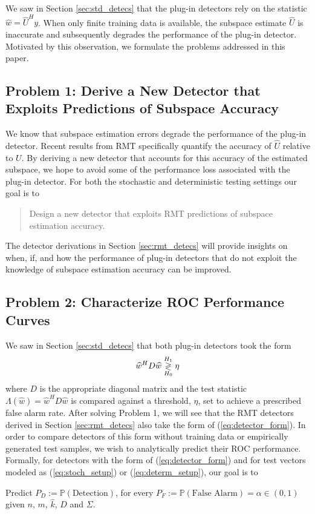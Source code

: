 We saw in Section \ref{sec:std_detecs} that the plug-in detectors rely on the statistic $\widehat{w}=\widehat{U}^Hy$. When only finite training data is available, the subspace estimate $\widehat{U}$ is inaccurate and subsequently degrades the performance of the plug-in detector. Motivated by this observation, we formulate the problems addressed in this paper.

\subsection{Problem 1: Derive a New Detector that Exploits Predictions of Subspace Accuracy}\label{sec:ps_prob2}

We know that subspace estimation errors degrade the performance of the plug-in detector. Recent results from RMT specifically quantify the accuracy of $\widehat{U}$ relative to $U$. By deriving a new detector that accounts for this accuracy of the estimated subspace, we hope to avoid some of the performance loss associated with the plug-in detector. For both the stochastic and deterministic testing settings our goal is to 
\begin{quote}
Design a new detector that exploits RMT predictions of subspace estimation accuracy.
\end{quote}
The detector derivations in Section \ref{sec:rmt_detecs} will provide insights on when, if, and how the performance of plug-in detectors that do not exploit the knowledge of subspace estimation accuracy can be improved.
 
\subsection{Problem 2: Characterize ROC Performance Curves}\label{sec:problem 1}

We saw in Section \ref{sec:std_detecs} that both plug-in detectors took the form
\begin{equation}\label{eq:detector_form}
\widehat{w}^HD\widehat{w}\detgtrless\eta
\end{equation}
where $D$ is the appropriate diagonal matrix and the test statistic $\Lambda(\widehat{w})=\widehat{w}^HD\widehat{w}$ is compared against a threshold, $\eta$, set to achieve a prescribed false alarm rate. After solving Problem 1, we will see that the RMT detectors derived in Section \ref{sec:rmt_detecs} also take the form of (\ref{eq:detector_form}). In order to compare detectors of this form without training data or empirically generated test samples, we wish to analytically predict their ROC performance. Formally, for detectors with the form of (\ref{eq:detector_form}) and for test vectors modeled as (\ref{eq:stoch_setup}) or (\ref{eq:determ_setup}), our goal is to
\begin{center}
Predict $P_D:=\mathbb{P}(\text{Detection})$, for every $P_F:=\mathbb{P}(\text{False Alarm})=\alpha \in (0,1)$ given $n$, $m$, $\widehat{k}$, $D$ and $\Sigma$.
\end{center}

